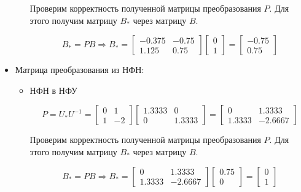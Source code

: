\begin{itemize}
\begin{itemize}
	Проверим корректность полученной матрицы преобразования $P$. Для этого получим матрицу $B_{*}$ через матрицу $B$. 
	
	\begin{equation*}
	\text{$B_{*}=PB$}
	\Longrightarrow
	\text{$B_{*}=
	\begin{bmatrix} -0.375 &   -0.75 \\
    1.125 &    0.75 \end{bmatrix}
	\begin{bmatrix} 0 \\ 1 \end{bmatrix}
	=\begin{bmatrix} -0.75 \\ 0.75 \end{bmatrix}$}
	\end{equation*}
	
	\end{itemize}
	\item Матрица преобразования из НФН:
	\begin{itemize}

	\item НФН в НФУ
		
	\begin{equation*}
	\text{$P=U_{*}U^{-1}=
	\begin{bmatrix}
0 & 1\\ 1 & -2
\end{bmatrix}
\begin{bmatrix} 1.3333   &      0 \\
         0  &  1.3333 \end{bmatrix}
=\begin{bmatrix}   0  &  1.3333 \\
    1.3333  & -2.6667 \end{bmatrix}$}
	\end{equation*}
	
	Проверим корректность полученной матрицы преобразования $P$. Для этого получим матрицу $B_{*}$ через матрицу $B$.
	
	\begin{equation*}
	\text{$B_{*}=PB$}
	\Longrightarrow
	\text{$B_{*}=
	\begin{bmatrix}   0  &  1.3333 \\
    1.3333  & -2.6667 \end{bmatrix}
   \begin{bmatrix} 0.75 \\ 0 \end{bmatrix}
   =\begin{bmatrix} 0 \\ 1 \end{bmatrix}$}
	\end{equation*}
	

\end{itemize}
\end{itemize}
